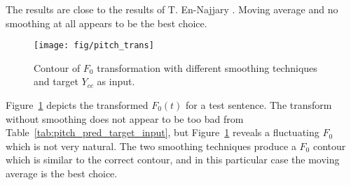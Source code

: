 
The results are close to the results of T. En-Najjary \etal \cite{najjary03new}. Moving average and no smoothing at all appears to be the best choice.

\begin{figure}[htbp]
	\begin{center}
		\texttt{[image: fig/pitch\_trans]}
		\caption{Contour of $F_0$ transformation with different smoothing techniques and target $Y_{cc}$ as input.}
		\label{fig:pitch_trans}
	\end{center}
\end{figure}
Figure~\ref{fig:pitch_trans} depicts the transformed $F_0(t)$ for a test sentence. The transform without smoothing does not appear to be too bad from Table~\ref{tab:pitch_pred_target_input}, but Figure~\ref{fig:pitch_trans} reveals a fluctuating $F_0$ which is not very natural. The two smoothing techniques produce a $F_0$ contour which is similar to the correct contour, and in this particular case the moving average is the best choice. 

